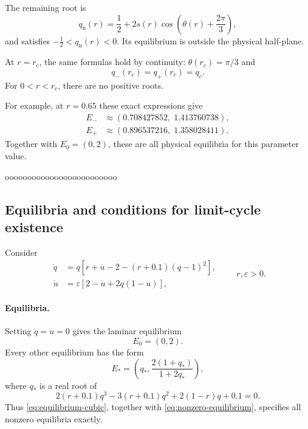 \documentclass[11pt,reqno]{amsart}
\theoremstyle{plain}
\theoremstyle{definition}
\theoremstyle{remark}
\begin{document}
The remaining root is
\[
q_{\mathrm n}(r)=
\frac12+2s(r)
\cos\left(\theta(r)+\frac{2\pi}{3}\right),
\]
and satisfies $-\tfrac12<q_{\mathrm n}(r)<0$.
Its equilibrium is outside the physical half-plane.

At $r=r_c$, the same formulas hold by continuity:
$\theta(r_c)=\pi/3$ and
\[
q_-(r_c)=q_+(r_c)=q_c.
\]
For $0<r<r_c$, there are no positive roots.

For example, at $r=0.65$ these exact expressions give
\[
\begin{aligned}
E_-&\approx(0.708427852,\;1.413760738),\\
E_+&\approx(0.896537216,\;1.358028411).
\end{aligned}
\]
Together with $E_0=(0,2)$, these are all physical
equilibria for this parameter value.












ooooooooooooooooooooooooo

\subsection{Equilibria and conditions for limit-cycle existence}

Consider
\begin{equation}
\begin{aligned}
\dot q&=q\left[r+u-2-(r+0.1)(q-1)^2\right],\\
\dot u&=\varepsilon\left[2-u+2q(1-u)\right],
\end{aligned}
\qquad r,\varepsilon>0.
\label{eq:model}
\end{equation}

\paragraph{Equilibria.}
Setting $\dot q=\dot u=0$ gives the laminar equilibrium
\[
E_0=(0,2).
\]
Every other equilibrium has the form
\begin{equation}
E_*=\left(q_*,\frac{2(1+q_*)}{1+2q_*}\right),
\label{eq:nonzero-equilibrium}
\end{equation}
where $q_*$ is a real root of
\begin{equation}
2(r+0.1)q^3-3(r+0.1)q^2
+2(1-r)q+0.1=0.
\label{eq:equilibrium-cubic}
\end{equation}
Thus \eqref{eq:equilibrium-cubic}, together with
\eqref{eq:nonzero-equilibrium}, specifies all nonzero
equilibria exactly.
\end{document}
